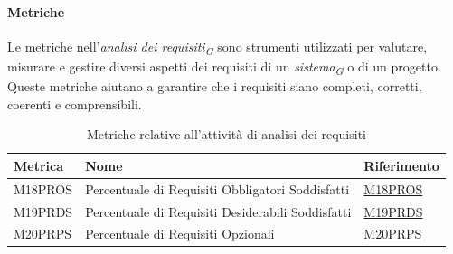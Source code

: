\paragraph{Metriche}
Le metriche nell'\textit{analisi dei requisiti}\textsubscript{\textit{G}} sono strumenti utilizzati per valutare, misurare e gestire diversi aspetti dei requisiti di un \textit{sistema}\textsubscript{\textit{G}} o di un progetto. Queste metriche aiutano a garantire che i requisiti siano completi, corretti, coerenti e comprensibili.
\begin{table}[H]
    \centering
    \begin{tabular}{|C{3cm}|C{3cm}|C{4cm}|}
    \hline
    Metrica & Nome & Riferimento \\
    \hline \hline
    M18PROS & Percentuale di Requisiti Obbligatori Soddisfatti &  \hyperlink{item:M18PROS}{\textcolor{linkcolor}{M18PROS}} \\
    M19PRDS & Percentuale di Requisiti Desiderabili Soddisfatti &  \hyperlink{item:M19PRDS}{\textcolor{linkcolor}{M19PRDS}} \\
    M20PRPS & Percentuale di Requisiti Opzionali & \hyperlink{item:M20PRPS}{\textcolor{linkcolor}{M20PRPS}} \\
    \hline
    \end{tabular}
    \caption{Metriche relative all'attività di analisi dei requisiti}
\end{table}


